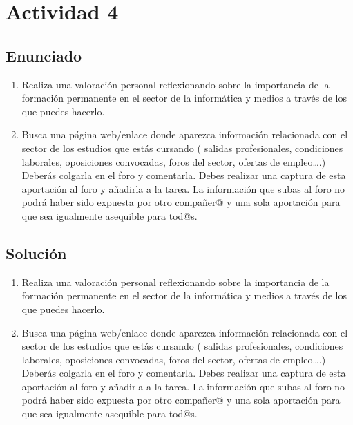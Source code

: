 \section{Actividad 4}
\subsection{Enunciado}

\begin{enumerate}[label={\alph*}]
    \item Realiza una valoración personal reflexionando sobre la importancia de la formación permanente en el sector de la informática y medios a través de los que puedes hacerlo.
    \item Busca una página web/enlace donde aparezca información relacionada con el sector de los estudios que estás cursando ( salidas profesionales, condiciones laborales, oposiciones convocadas,  foros del sector, ofertas de empleo….) Deberás colgarla en el foro y  comentarla. Debes realizar una captura de esta aportación al foro y añadirla a la tarea. La información que subas al foro no podrá haber sido expuesta por otro compañer@ y una sola aportación para que sea igualmente asequible para tod@s.
\end{enumerate}

\subsection{Solución}

\begin{enumerate}[label={\alph*}]
    \item Realiza una valoración personal reflexionando sobre la importancia de la formación permanente en el sector de la informática y medios a través de los que puedes hacerlo.
    \item Busca una página web/enlace donde aparezca información relacionada con el sector de los estudios que estás cursando ( salidas profesionales, condiciones laborales, oposiciones convocadas,  foros del sector, ofertas de empleo….) Deberás colgarla en el foro y  comentarla. Debes realizar una captura de esta aportación al foro y añadirla a la tarea. La información que subas al foro no podrá haber sido expuesta por otro compañer@ y una sola aportación para que sea igualmente asequible para tod@s.
\end{enumerate}










\newpage



